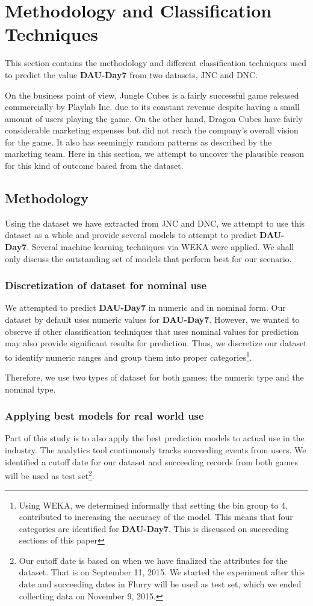 \section{Methodology and Classification Techniques}
This section contains the methodology and different classification techniques used to predict the value \textbf{DAU-Day7} from two datasets, JNC and DNC.

On the business point of view, Jungle Cubes is a fairly successful game released commercially by Playlab Inc. due to its constant revenue despite having a small amount of users playing the game. On the other hand, Dragon Cubes have fairly considerable marketing expenses but did not reach the company's overall vision for the game. It also has seemingly random patterns as described by the marketing team. Here in this section, we attempt to uncover the plausible reason for this kind of outcome based from the dataset.

\subsection{Methodology}
Using the dataset we have extracted from JNC and DNC, we attempt to use this dataset as a whole and provide several models to attempt to predict \textbf{DAU-Day7}. Several machine learning techniques via WEKA were applied. We shall only discuss the outstanding set of models that perform best for our scenario.

\subsubsection{Discretization of dataset for nominal use}
We attempted to predict \textbf{DAU-Day7} in numeric and in nominal form. Our dataset by default uses numeric values for \textbf{DAU-Day7}. However, we wanted to observe if other classification techniques that uses nominal values for prediction may also provide significant results for prediction. Thus, we discretize our dataset to identify numeric ranges and group them into proper categories\footnote{Using WEKA, we determined informally that setting the bin group to 4, contributed to increasing the accuracy of the model. This means that four categories are identified for \textbf{DAU-Day7}. This is discussed on succeeding sections of this paper}. 

Therefore, we use two types of dataset for both games; the numeric type and the nominal type.

\subsubsection{Applying best models for real world use}
Part of this study is to also apply the best prediction models to actual use in the industry. The analytics tool continuously tracks succeeding events from users. We identified a cutoff date for our dataset and succeeding records from both games will be used as test set\footnote{Our cutoff date is based on when we have finalized the attributes for the dataset. That is on September 11, 2015. We started the experiment after this date and succeeding dates in Flurry will be used as test set, which we ended collecting data on November 9, 2015.}.

